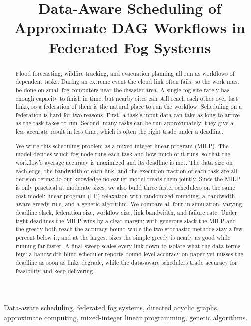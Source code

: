 \documentclass[conference]{IEEEtran}
\title{Data-Aware Scheduling of Approximate DAG Workflows in Federated Fog Systems}
\author{\IEEEauthorblockN{Anonymous Author(s)}
\IEEEauthorblockA{Affiliation anonymized for double-blind review}}
\date{}
\begin{document}
\maketitle

\begin{abstract}
Flood forecasting, wildfire tracking, and evacuation planning all run as workflows of dependent tasks. During an extreme event the cloud link often fails, so the work must be done on small fog computers near the disaster area. A single fog site rarely has enough capacity to finish in time, but nearby sites can still reach each other over fast links, so a federation of them is the natural place to run the workflow. Scheduling on a federation is hard for two reasons. First, a task's input data can take as long to arrive as the task takes to run. Second, many tasks can be run approximately: they give a less accurate result in less time, which is often the right trade under a deadline.

We write this scheduling problem as a mixed-integer linear program (MILP). The model decides which fog node runs each task and how much of it runs, so that the workflow's average accuracy is maximized and its deadline is met. The data size on each edge, the bandwidth of each link, and the execution fraction of each task are all decision terms; to our knowledge no earlier model treats them jointly. Since the MILP is only practical at moderate sizes, we also build three faster schedulers on the same cost model: linear-program (LP) relaxation with randomized rounding, a bandwidth-aware greedy rule, and a genetic algorithm. We compare all four in simulation, varying deadline slack, federation size, workflow size, link bandwidth, and failure rate. Under tight deadlines the MILP wins by a clear margin; with generous slack the MILP and the greedy both reach the accuracy bound while the two stochastic methods stay a few percent below it; and at the largest sizes the simple greedy is nearly as good while running far faster. A final sweep scales every link down to isolate what the data terms buy: a bandwidth-blind scheduler reports bound-level accuracy on paper yet misses the deadline as soon as links degrade, while the data-aware schedulers trade accuracy for feasibility and keep delivering.
\end{abstract}

\begin{IEEEkeywords}
Data-aware scheduling, federated fog systems, directed acyclic graphs, approximate computing, mixed-integer linear programming, genetic algorithms.
\end{IEEEkeywords}
\end{document}

